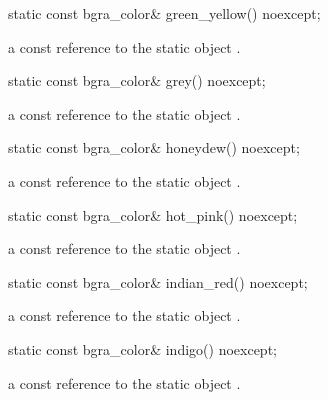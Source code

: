 \begin{itemdecl}
static const bgra_color& green_yellow() noexcept;
\end{itemdecl}
\begin{itemdescr}
\pnum
\returns
a const reference to the static  object .
\end{itemdescr}

\begin{itemdecl}
static const bgra_color& grey() noexcept;
\end{itemdecl}
\begin{itemdescr}
\pnum
\returns
a const reference to the static  object .
\end{itemdescr}

\begin{itemdecl}
static const bgra_color& honeydew() noexcept;
\end{itemdecl}
\begin{itemdescr}
\pnum
\returns
a const reference to the static  object .
\end{itemdescr}

\begin{itemdecl}
static const bgra_color& hot_pink() noexcept;
\end{itemdecl}
\begin{itemdescr}
\pnum
\returns
a const reference to the static  object .
\end{itemdescr}

\begin{itemdecl}
static const bgra_color& indian_red() noexcept;
\end{itemdecl}
\begin{itemdescr}
\pnum
\returns
a const reference to the static  object .
\end{itemdescr}

\begin{itemdecl}
static const bgra_color& indigo() noexcept;
\end{itemdecl}
\begin{itemdescr}
\pnum
\returns
a const reference to the static  object .
\end{itemdescr}


